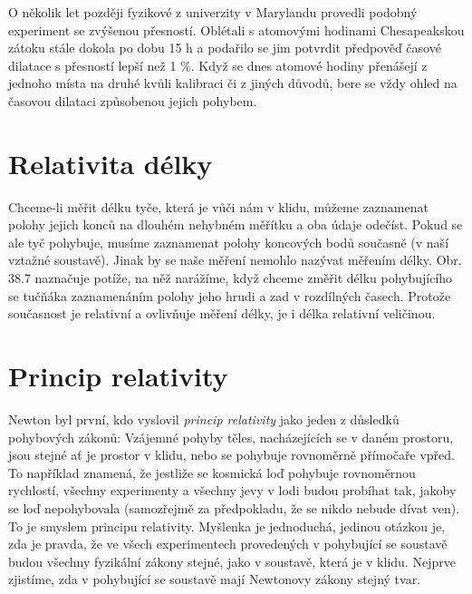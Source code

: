       O několik let později fyzikové z univerzity v Marylandu provedli podobný experiment se
      zvýšenou přesností. Oblétali s atomovými hodinami Chesapeakskou zátoku stále dokola po dobu 15
      h a podařilo se jim potvrdit předpověď časové dilatace s přesností lepší než 1 \%. Když se
      dnes atomové hodiny přenášejí z jednoho místa na druhé kvůli kalibraci či z jiných důvodů,
      bere se vždy ohled na časovou dilataci způsobenou jejich pohybem.

      

      

      
  
  \section{Relativita délky}\label{fyz:IchapXVsecII}     
    Chceme-li měřit délku tyče, která je vůči nám v klidu, můžeme zaznamenat polohy jejich konců na
    dlouhém nehybném měřítku a oba údaje odečíst. Pokud se ale tyč pohybuje, musíme zaznamenat
    polohy koncových bodů současně (v naší vztažné soustavě). Jinak by se naše měření nemohlo
    nazývat měřením délky. Obr. 38.7 naznačuje potíže, na něž narážíme, když chceme změřit délku
    pohybujícího se tučňáka zaznamenáním polohy jeho hrudi a zad v rozdílných časech. Protože
    současnost je relativní a ovlivňuje měření délky, je i délka relativní veličinou.  





    



  \section{Princip relativity}\label{fyz:IchapXVsecIII}     
    Newton byl první, kdo vyslovil \emph{princip relativity} jako jeden z důsledků pohybových
    zákonů: Vzájemné pohyby těles, nacházejících se v daném prostoru, jsou stejné ať je prostor v
    klidu, nebo se pohybuje rovnoměrně přímočaře vpřed. To například znamená, že jestliže se
    kosmická loď pohybuje rovnoměrnou rychlostí, všechny experimenty a všechny jevy v lodi budou
    probíhat tak, jakoby se loď nepohybovala (samozřejmě za předpokladu, že se nikdo nebude dívat
    ven). To je smyslem principu relativity. Myšlenka je jednoduchá, jedinou otázkou je, zda je
    pravda, že ve všech experimentech provedených v pohybující se soustavě budou všechny fyzikální
    zákony stejné, jako v soustavě, která je v klidu. Nejprve zjistíme, zda v pohybující se soustavě
    mají Newtonovy zákony stejný tvar.

